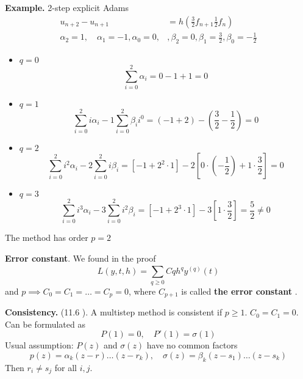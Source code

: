 \documentclass{article}
\theoremstyle{remark}
\begin{document}
\begin{tcolorbox}
  \textbf{Example.}  2-step explicit Adams \[
    \begin{split}
    u_{n+2} - u_{n+1} &=  h\left( \frac{3}{2} f_{n+1} \frac{1}{2} f_{n} \right) \\
    \alpha _{2} = 1, \quad  \alpha _{1} = -1, \alpha _{0} = 0,  &  , \beta _{2} = 0, \beta _{1} = \frac{3}{2} , \beta _{0} = -\frac{1}{2} 
    \end{split} 
  \] 
  \begin{itemize}
    \item $q=0$ \[
    \sum_{i=0}^{2}  \alpha _{i} = 0 -1 + 1 = 0 
    \] 
  \item $q=1$ \[
  \sum_{i=0}^{2}  i \alpha _{i} - 1 \sum_{i=0}^{2}  \beta _{i} i^{0} = \left( -1 +2 \right) - \left( \frac{3}{2} - \frac{1}{2} \right) = 0
  \] 
\item $q = 2$ \[
\sum_{i=0}^{2} i^2 \alpha _{i} - 2 \sum_{i=0}^{2}  i \beta _{i} = \left[ -1 +  2^2 \cdot 1\right]  - 2 \left[ 0 \cdot \left( -\frac{1}{2} \right) + 1\cdot \frac{3}{2} \right] = 0
\] 
\item $q = 3$  \[
\sum_{i=0}^{2}  i^3 \alpha _{i}  - 3  \sum_{i=0}^{2}  i^2 \beta _{i} = \left[ -1 + 2 ^3 \cdot 1 \right] - 3 \left[ 1 \cdot  \frac{3}{2} \right] = \frac{5}{2} \neq 0
\] 
  \end{itemize}
  The method has order $p=2$
\end{tcolorbox}

\begin{definition}
  
\textbf{Error constant}. We found in the proof \[
L\left( y,t,h \right) = \sum_{q \ge 0}^{}  C q h^{q} y^{(q)}\left( t \right) 
\] 
and $p \implies  C_{0} = C_{1} = \ldots = C_{p} = 0$, where $C_{p+1}$ is called \textbf{the error constant} .
\end{definition}

\begin{definition}
  \textbf{Consistency.}  (11.6   ). A multistep method is consistent if $p \ge 1$. $C_{0} = C_{1} = 0$. Can be formulated as \[
    P\left( 1 \right) = 0, \quad  P'  \left( 1 \right) = \sigma \left( 1 \right) 
  \] 
  Usual assumption: $P\left( z \right)$ and $\sigma \left( z \right)$ have no common factors \[
  p\left( z \right) = \alpha _{k}\left( z-r \right) \ldots \left( z - r_{k} \right) , \quad  \sigma \left( z \right) = \beta  _{k} \left( z-s_{1} \right) \ldots \left( z - s_{k} \right)  
  \] 
  Then $r_{i} \neq s_{j}$ for all $i,j$.
\end{definition}
\end{document}
